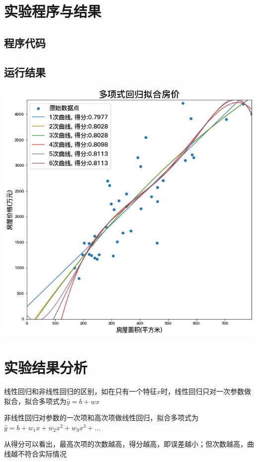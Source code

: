 \documentclass[a4paper]{ctexart}
\begin{document}
  \section{实验程序与结果}
  \subsection{程序代码}
  
  \subsection{运行结果}
  \includegraphics[width=1.0\textwidth]{fig/output.png}

  \section{实验结果分析}
  线性回归和非线性回归的区别，如在只有一个特征$x$时，线性回归只对一次参数做拟合，拟合多项式为$\hat{y}=b+wx$

  非线性回归对参数的一次项和高次项做线性回归，拟合多项式为$\hat{y}=b+w_1x+w_2x^2+w_3x^3+...$

  从得分可以看出，最高次项的次数越高，得分越高，即误差越小；但次数越高，曲线越不符合实际情况
\end{document}
